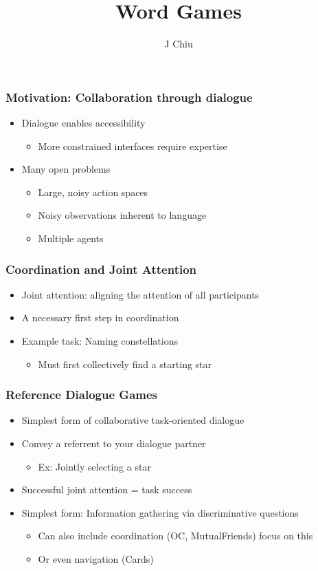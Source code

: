 \documentclass{beamer}
\title{Word Games}
\author{J Chiu}
\begin{document}
\begin{frame}[plain]
\titlepage
\end{frame}

\begin{frame}
\frametitle{Motivation: Collaboration through dialogue}
\begin{itemize}
\item Dialogue enables accessibility
    \begin{itemize}
    \item More constrained interfaces require expertise
    \end{itemize}
\item Many open problems
    \begin{itemize}
    \item Large, noisy action spaces
    \item Noisy observations inherent to language
    \item Multiple agents
    \end{itemize}
\end{itemize}
\end{frame}

\begin{frame}
\frametitle{Coordination and Joint Attention}
\begin{itemize}
\item Joint attention: aligning the attention of all participants
\item A necessary first step in coordination
\item Example task: Naming constellations
    \begin{itemize}
    \item Must first collectively find a starting star
    \end{itemize}
\end{itemize}
\end{frame}

\begin{frame}
\frametitle{Reference Dialogue Games}
\begin{itemize}
\item Simplest form of collaborative task-oriented dialogue
\item Convey a referrent to your dialogue partner
    \begin{itemize}
    \item Ex: Jointly selecting a star
    \end{itemize}
\item Successful joint attention = task success

\item Simplest form: Information gathering via discriminative questions
    \begin{itemize}
    \item Can also include coordination (OC, MutualFriends) focus on this
    \item Or even navigation (Cards)
    \end{itemize}

\end{itemize}
\end{frame}
\end{document}
